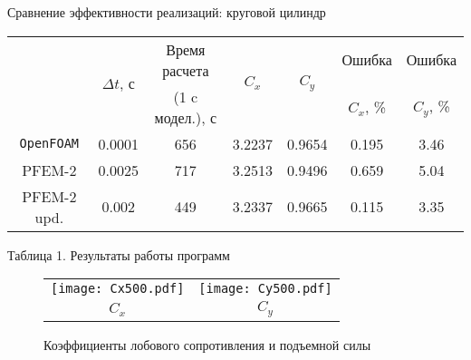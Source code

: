 \documentclass[9pt, ignoreonframetext,unicode]{beamer}
\begin{document}
\begin{frame}{Сравнение эффективности реализаций: круговой цилиндр}
	\begin{center}
	\begin{tabular}{|c|c|c|c|c|c|c|}\hline	
		& \multirow{2}{*}{$\Delta t$, с}& Время расчета & \multirow{2}{*}{$C_x$} & \multirow{2}{*}{$C_y$} & Ошибка & Ошибка \\ 
		& &   (1 c модел.), с& & & $C_x$, \%    & $C_y$, \% \\ \hline
		{\color{red} \texttt{OpenFOAM}} & 0.0001		& 656 				  & 3.2237 & 0.9654 & 0.195 & 3.46 \\ \hline
		PFEM-2 & 0.0025			& 717   	  & 3.2513 & 0.9496 & 0.659 & 5.04\\ \hline
		{\color{blue} PFEM-2 upd. } & 0.002	& 449   			  & 3.2337 & 0.9665 & 0.115 & 3.35\\ \hline
	\end{tabular}
\end{center}
\begin{center}
	Таблица 1. Результаты работы программ
\end{center}

\vspace*{-2mm}
\begin{figure}[!h]
	\centering
	\begin{tabular}{cc}
		\texttt{[image: Cx500.pdf]} & 	\texttt{[image: Cy500.pdf]}\\
		 $C_x$ & $C_y$\\
	\end{tabular}
	\caption{Коэффициенты лобового сопротивления и подъемной силы}
	\label{picCx0}
\end{figure}

\end{frame}
\end{document}
